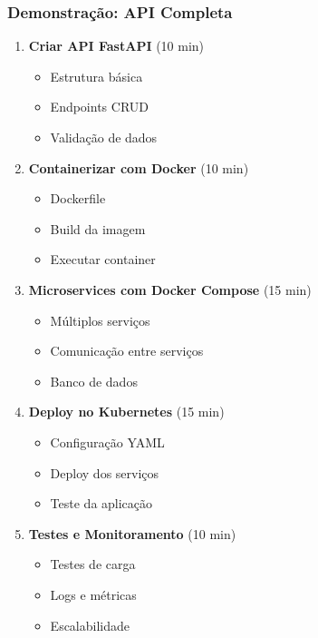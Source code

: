 \documentclass[aspectratio=169]{beamer}
\begin{document}
\begin{frame}
    \frametitle{Demonstração: API Completa}
    \begin{enumerate}
        \item \textbf{Criar API FastAPI} (10 min)
        \begin{itemize}
            \item Estrutura básica
            \item Endpoints CRUD
            \item Validação de dados
        \end{itemize}
        
        \item \textbf{Containerizar com Docker} (10 min)
        \begin{itemize}
            \item Dockerfile
            \item Build da imagem
            \item Executar container
        \end{itemize}
        
        \item \textbf{Microservices com Docker Compose} (15 min)
        \begin{itemize}
            \item Múltiplos serviços
            \item Comunicação entre serviços
            \item Banco de dados
        \end{itemize}
        
        \item \textbf{Deploy no Kubernetes} (15 min)
        \begin{itemize}
            \item Configuração YAML
            \item Deploy dos serviços
            \item Teste da aplicação
        \end{itemize}
        
        \item \textbf{Testes e Monitoramento} (10 min)
        \begin{itemize}
            \item Testes de carga
            \item Logs e métricas
            \item Escalabilidade
        \end{itemize}
    \end{enumerate}
\end{frame}
\end{document}
